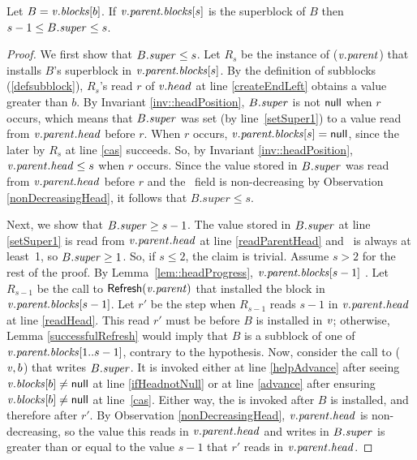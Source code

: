 \begin{lemma}
\label{superRelation}
Let $B=\mbox{\textnormal{\textit{v}}}.\mbox{\textnormal{\textit{blocks}}}[b]$.
If $\mbox{\textnormal{\textit{v}}}.\mbox{\textit{parent.blocks}}[s]$ is the superblock of $B$ then $s-1\leq B.\mbox{\textit{super}}\leq s$.
\end{lemma}
\begin{proof}
We first show that $B.\mbox{\textit{super}}\leq s$.
Let $R_s$ be the instance of ($\mbox{\textnormal{\textit{v}}}.\mbox{\textit{parent}}$) that installs $B$'s superblock 
in $\mbox{\textnormal{\textit{v}}}.\mbox{\textit{parent.blocks}}[s]$.
By the definition of  subblocks (\ref{defsubblock}), $R_s$'s read $r$ of $\mbox{\textnormal{\textit{v}}}.head$ at line \ref{createEndLeft} %
obtains a value greater than $b$.
By Invariant \ref{inv::headPosition}, $B.\mbox{\textit{super}}$ is not $\mbox{\sf null}$ when $r$ occurs, which means
that $B.\mbox{\textit{super}}$ was set (by line~\ref{setSuper1}) to a value read from $\mbox{\textnormal{\textit{v}}}.\mbox{\textit{parent}}.\mbox{\textit{head}}$ before $r$.
When $r$ occurs, $\mbox{\textnormal{\textit{v}}}.\mbox{\textit{parent.blocks}}[s] = \mbox{\sf null}$, since the later  by $R_s$ at line
\ref{cas} succeeds.
So, by Invariant \ref{inv::headPosition}, $\mbox{\textnormal{\textit{v}}}.\mbox{\textit{parent}}.\mbox{\textit{head}} \leq s$ when $r$ occurs.
Since the value stored in $B.\mbox{\textit{super}}$ was read from $\mbox{\textnormal{\textit{v}}}.\mbox{\textit{parent.head}}$ before $r$ and the \head\ field is non-decreasing by Observation \ref{nonDecreasingHead}, it follows that $B.super\leq s$.

Next, we show that $B.\mbox{\textit{super}}\geq s-1$.
The value stored in $B.\mbox{\textit{super}}$ at line \ref{setSuper1} is read from $\mbox{\textnormal{\textit{v}}}.\mbox{\textit{parent}}.\mbox{\textit{head}}$ at line \ref{readParentHead} and \head\ is always at least~1, so $B.\mbox{\textit{super}} \geq 1$.
So, if $s\leq 2$, the claim is trivial.  Assume $s>2$ for the rest of the proof.
By Lemma~\ref{lem::headProgress}, $\mbox{\textnormal{\textit{v}}}.\mbox{\textit{parent.blocks}}[s-1]$ .  Let $R_{s-1}$ be the call to
${\sf Refresh}(\mbox{\textnormal{\textit{v}}}.\mbox{\textit{parent}})$ that installed the block in $\mbox{\textnormal{\textit{v}}}.\mbox{\textit{parent.blocks}}[s-1]$.
Let $r'$ be the step when $R_{s-1}$ reads $s-1$ in $\mbox{\textnormal{\textit{v}}}.\mbox{\textit{parent}}.\mbox{\textit{head}}$ at line \ref{readHead}.
This read $r'$ must be before $B$ is installed in $\mbox{\textnormal{\textit{v}}}$;
otherwise, Lemma \ref{successfulRefresh} would imply that $B$ is a subblock of one of 
$\mbox{\textnormal{\textit{v}}}.\mbox{\textit{parent.blocks}}[1..s-1]$, contrary to the hypothesis.
Now, consider the call to ($\mbox{\textnormal{\textit{v}}}, b$) that writes $B.\mbox{\textit{super}}$.
It is invoked either 
at line \ref{helpAdvance} after seeing $\mbox{\textnormal{\textit{v}}}.\mbox{\textit{blocks}}[b]\neq \mbox{\sf null}$ at line \ref{ifHeadnotNull}
or at line \ref{advance} after ensuring $\mbox{\textnormal{\textit{v}}}.\mbox{\textit{blocks}}[b]\neq \mbox{\sf null}$ at line~\ref{cas}.
Either way, the  is invoked after $B$ is installed, and therefore after $r'$.
By Observation \ref{nonDecreasingHead}, $\mbox{\textnormal{\textit{v}}}.\mbox{\textit{parent}}.\mbox{\textit{head}}$ is non-decreasing, so 
the value this  reads in $\mbox{\textnormal{\textit{v}}}.\mbox{\textit{parent}}.\mbox{\textit{head}}$ and
writes in $B.\mbox{\textit{super}}$ is greater than or equal to the value $s-1$ that $r'$ reads in $\mbox{\textnormal{\textit{v}}}.\mbox{\textit{parent}}.\mbox{\textit{head}}$.
\end{proof}


